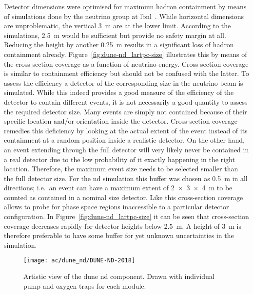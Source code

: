 Detector dimensions were optimised for maximum hadron containment by means of simulations done by the neutrino group at \gls{lbnl}~\cite{lartpcSizeChris}.
While horizontal dimensions are unproblematic, the vertical \SI{3}{\metre} are at the lower limit.
According to the simulations, \SI{2.5}{\metre} would be sufficient but provide no safety margin at all.
Reducing the height by another \SI{0.25}{\metre} results in a significant loss of hadron containment already.
Figure~\ref{fig:dune-nd_lartpc-size} illustrates this by means of the cross-section coverage as a function of neutrino energy.
Cross-section coverage is similar to containment efficiency but should not be confused with the latter.
To assess the efficiency a detector of the corresponding size in the neutrino beam is simulated.
While this indeed provides a good measure of the efficiency of the detector to contain different events, it is not necessarily a good quantity to assess the required detector size.
Many events are simply not contained because of their specific location and/or orientation inside the detector.
Cross-section coverage remedies this deficiency by looking at the actual extent of the event instead of its containment at a random position inside a realistic detector.
On the other hand, an event extending through the full detector will very likely never be contained in a real detector due to the low probability of it exactly happening in the right location.
Therefore, the maximum event size needs to be selected smaller than the full detector size.
For the \gls{nd} simulation this buffer was chosen as \SI{0.5}{\metre} in all directions; i.e.\ an event can have a maximum extent of \SI{2 x 3 x 4}{\metre} to be counted as contained in a nominal size detector.
Like this cross-section coverage allows to probe for phase space regions inaccessible to a particular detector configuration.
In Figure~\ref{fig:dune-nd_lartpc-size} it can be seen that cross-section coverage decreases rapidly for detector heights below \SI{2.5}{\metre}.
A height of \SI{3}{\metre} is therefore preferable to have some buffer for yet unknown uncertainties in the simulation.

\begin{figure}[tbp]
	\centering
	\texttt{[image: ac/dune\_nd/DUNE-ND-2018]}
	\caption[\AC{}   artistic view]{%
		Artistic view of the \acrshort{dune} \acrshort{nd} \AC{} component.
		Drawn with individual pump and oxygen traps for each module.
	}
	\label{fig:dune-nd_ac}
\end{figure}

